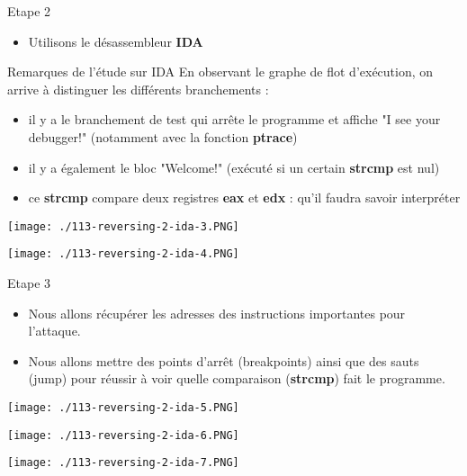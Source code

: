 \documentclass{beamer}
\begin{document}
	\begin{frame}
	\begin{block}{Etape 2}
		\begin{itemize}
			\item Utilisons le désassembleur \textbf{IDA}
		\end{itemize}
	\end{block}
	\begin{exampleblock}{Remarques de l'étude sur IDA} 
		En observant le graphe de flot d'exécution, on arrive à distinguer les différents branchements : 
		\begin{itemize}
			\item il y a le branchement de test qui arrête le programme et affiche "I see your debugger!" (notamment avec la fonction \textbf{ptrace})
			\item il y a également le bloc "Welcome!" (exécuté si un certain \textbf{strcmp} est nul)
			\item ce \textbf{strcmp} compare deux registres \textbf{eax} et \textbf{edx} : qu'il faudra savoir interpréter
		\end{itemize}
	\end{exampleblock}
	\end{frame}

	\begin{frame}
		\begin{center}
			\texttt{[image: ./113-reversing-2-ida-3.PNG]}
		\end{center}
	\end{frame}

	\begin{frame}
	\begin{center}
		\texttt{[image: ./113-reversing-2-ida-4.PNG]}
	\end{center}
	\end{frame}

	\begin{frame}
		\begin{block}{Etape 3}
			\begin{itemize}
				\item Nous allons récupérer les adresses des instructions importantes pour l'attaque. 
				\item Nous allons mettre des points d'arrêt (breakpoints) ainsi que des sauts (jump) pour réussir à voir quelle comparaison (\textbf{strcmp}) fait le programme.
			\end{itemize}
		\end{block}
		\begin{center}
			\texttt{[image: ./113-reversing-2-ida-5.PNG]}
		\end{center}
			\bigskip
		\begin{center}
			\texttt{[image: ./113-reversing-2-ida-6.PNG]}
		\end{center}
			\bigskip
		\begin{center}
			\texttt{[image: ./113-reversing-2-ida-7.PNG]}
		\end{center}
	\end{frame}
\end{document}
